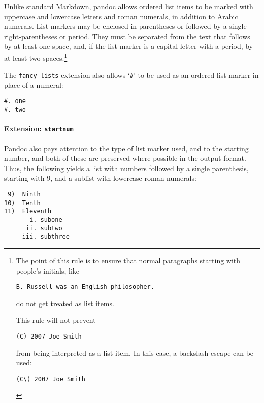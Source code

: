 \documentclass[]{article}
\begin{document}
Unlike standard Markdown, pandoc allows ordered list items to be marked
with uppercase and lowercase letters and roman numerals, in addition to
Arabic numerals. List markers may be enclosed in parentheses or followed
by a single right-parentheses or period. They must be separated from the
text that follows by at least one space, and, if the list marker is a
capital letter with a period, by at least two spaces.\footnote{The point
  of this rule is to ensure that normal paragraphs starting with
  people's initials, like

\begin{Verbatim}
B. Russell was an English philosopher.
\end{Verbatim}

  do not get treated as list items.

  This rule will not prevent

\begin{Verbatim}
(C) 2007 Joe Smith
\end{Verbatim}

  from being interpreted as a list item. In this case, a backslash
  escape can be used:

\begin{Verbatim}
(C\) 2007 Joe Smith
\end{Verbatim}
}

The \texttt{fancy\_lists} extension also allows `\texttt{\#}' to be used
as an ordered list marker in place of a numeral:

\begin{verbatim}
#. one
#. two
\end{verbatim}

\hypertarget{extension-startnum}{%
\paragraph{\texorpdfstring{Extension:
\texttt{startnum}}{Extension: startnum}}\label{extension-startnum}}

Pandoc also pays attention to the type of list marker used, and to the
starting number, and both of these are preserved where possible in the
output format. Thus, the following yields a list with numbers followed
by a single parenthesis, starting with 9, and a sublist with lowercase
roman numerals:

\begin{verbatim}
 9)  Ninth
10)  Tenth
11)  Eleventh
       i. subone
      ii. subtwo
     iii. subthree
\end{verbatim}
\end{document}
